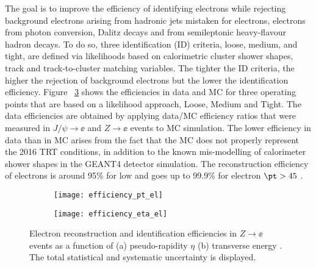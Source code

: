 The goal is to improve the efficiency of identifying electrons while rejecting background electrons arising from hadronic jets mistaken for electrons, 
electrons from photon conversion, Dalitz decays and from semileptonic heavy-flavour hadron decays.
To do so, three identification (ID) criteria, loose, medium, and tight, are defined via likelihoods based on calorimetric cluster shower shapes, 
track and track-to-cluster matching variables.
The tighter the ID criteria, the higher the rejection of background electrons but the lower the identification efficiency.
Figure ~\ref{fig:exp.reco.eff.el} shows the  efficiencies in data and MC for three operating points that are based on a likelihood approach, Loose, Medium and Tight. 
The data efficiencies are obtained by applying data/MC efficiency ratios that were measured in  $J/\psi\to\ee$ and $Z\to\ee$ events to MC simulation. 
The lower efficiency in data than in MC arises from the fact that the MC does not properly represent the 2016 TRT conditions, 
in addition to the known mis-modelling of calorimeter shower shapes in the GEANT4 detector simulation.
The reconstruction efficiency of electrons is around 95\% for low \pt and goes up to 99.9\% for electron $\pt > 45$ \GeV.


\begin{figure}[htb!]
\centering
\begin{subfigure}[t]{0.45\textwidth}
\texttt{[image: efficiency\_pt\_el]}
\subcaption{}
\label{fig:exp.reco.eff_pt}
\end{subfigure}
\begin{subfigure}[t]{0.45\textwidth}
\texttt{[image: efficiency\_eta\_el]}
\subcaption{}
\label{fig:exp.reco.eff_eta}
\end{subfigure}
\vspace{-0.25cm}
\caption{
Electron reconstruction and identification efficiencies in $Z\to\ee$ events as a function of (a) pseudo-rapidity $\eta$ (b) transverse energy \et.
The total statistical and systematic uncertainty is displayed. 
}
\label{fig:exp.reco.eff.el}
\end{figure} 



